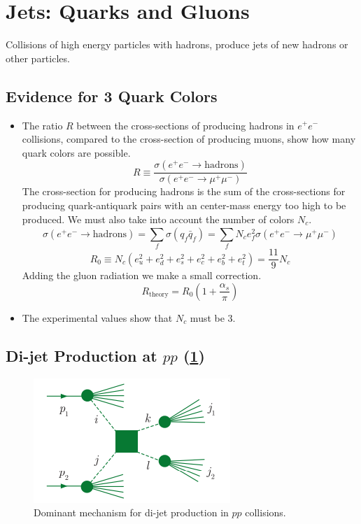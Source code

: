 \section{Jets: Quarks and Gluons}
Collisions of high energy particles with hadrons, produce jets of new hadrons or other particles. 

\subsection{Evidence for 3 Quark Colors}
\begin{itemize}
    \item The ratio $R$ between the cross-sections of producing hadrons in $e^+e^-$ collisions, compared to the cross-section of producing muons, show how many quark colors are possible. 
    \begin{equation}
      R ≡ \frac{σ(e^+e^- → \text{hadrons})}{σ(e^+e^- → μ^+μ^-)}
    \end{equation}
    The cross-section for producing hadrons is the sum of the cross-sections for producing quark-antiquark pairs with an center-mass energy too high to be produced. We must also take into account the number of colors $N_c$. 
    \begin{equation}
      σ(e^+e^- → \text{hadrons}) = ∑_{f}^{} σ(q_f \bar{q}_f) = ∑_{f}^{} N_c e^2_{f} σ(e^+e^- → μ^+μ^-)
    \end{equation}
    \begin{equation}
      R_0 ≡ N_c (e^2_{u} + e^2_{d} + e^2_{s} + e^2_{c} + e^2_{b} + e^2_{t}) = \frac{11}{9}N_c 
    \end{equation}
    Adding the gluon radiation we make a small correction. 
    \begin{equation}
      R_{\text{theory}} = R_0 \left(1 + \frac{α_s}{π}\right)
    \end{equation}
    \item The experimental values show that $N_c$ must be 3.
\end{itemize}


\subsection{Di-jet Production at $p p$ (\cref{fig: di-jet_production})}
\phantom{.}
\begin{figure}[h!]
\centering
\includegraphics[width = .45\textwidth]{di-jet_production.png}
\caption{Dominant mechanism for di-jet production in $pp$ collisions.}
\label{fig: di-jet_production}
\end{figure}


